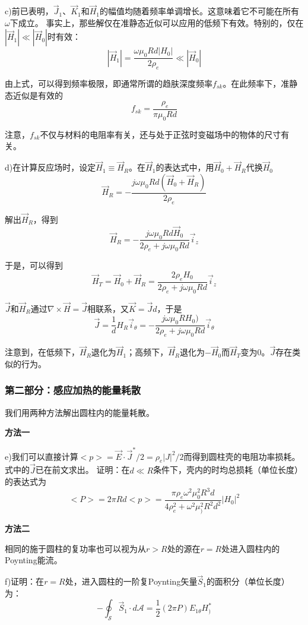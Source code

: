 c)前已表明，$\vec{J}_1$、$\vec{K}_1$和$\vec{H}_1$的幅值均随着频率单调增长。这意味着它不可能在所有$\omega$下成立。
事实上，那些解仅在准静态近似可以应用的低频下有效。特别的，仅在$|\vec{H}_1|\ll |\vec{H}_0|$时有效：
$$|\vec{H}_1|=\frac{\omega \mu_0 R d |H_0|}{2\rho_e}\ll |\vec{H}_0|$$

由上式，可以得到频率极限，即通常所谓的趋肤深度频率$f_{sk}$。在此频率下，准静态近似是有效的
$$f_{sk}=\frac{\rho_e}{\pi \mu_0 R d}$$

注意，$f_{sk}$不仅与材料的电阻率有关，还与处于正弦时变磁场中的物体的尺寸有关。

d)在计算反应场时，设定$\vec{H}_1\equiv \vec{H}_R$。在$\vec{H}_1$的表达式中，用$\vec{H}_0+\vec{H}_R$代换$\vec{H}_0$
$$\vec{H}_R=-\frac{j\omega \mu_0 R d (\vec{H}_0+\vec{H}_R)}{2\rho_e}$$

解出$\vec{H}_R$，得到
$$\vec{H}_R=-\frac{j\omega \mu_0 R d \vec{H}_0}{2\rho_e+j\omega \mu_0 R d}\vec{i}_z$$

于是，可以得到
$$\vec{H}_T=\vec{H}_0+\vec{H}_R=\frac{2\rho_e H_0}{2\rho_e+j\omega \mu_0 R d}\vec{i}_z$$

$\vec{J}$和$\vec{H}_R$通过$\nabla\times \vec{H}=\vec{J}$相联系，又$\vec{K}=\vec{J}d$，于是
$$\vec{J}=\frac{1}{d}H_R \vec{i}_\theta=-\frac{j\omega \mu_0 R H_0)}{2\rho_e+j\omega \mu_0 R d}\vec{i}_\theta$$

注意到，在低频下，$\vec{H}_R$退化为$\vec{H}_1$；高频下，$\vec{H}_R$退化为$-\vec{H}_0$而$\vec{H}_T$变为0。$\vec{J}$存在类似的行为。

\subsubsection*{第二部分：感应加热的能量耗散}
我们用两种方法解出圆柱内的能量耗散。

\textbf{方法一}

e)我们可以直接计算$<p>=\vec{E}\cdot \vec{J}^* /2=\rho_e |J|^2 /2$而得到圆柱壳的电阻功率损耗。式中的$\vec{J}$已在前文求出。
证明：在$d\ll R$条件下，壳内的时均总损耗（单位长度）的表达式为
$$<P>=2\pi R d<p>=\frac{\pi \rho_e \omega^2 \mu_0^2 R^3 d}{4\rho_e^2+\omega^2\mu_)^2 R^2 d^2} |H_0|^2$$

\textbf{方法二}

相同的施于圆柱的复功率也可以视为从$r>R$处的源在$r=R$处进入圆柱内的Poynting能流。

f)证明：在$r=R$处，进入圆柱的一阶复Poynting矢量$\vec{S}_1$的面积分（单位长度）为：
$$-\oint_{\mathcal{S}}\vec{S}_1 \cdot d\mathcal{A}=\frac{1}{2}(2\pi P)E_{1\theta} H_)^*$$

